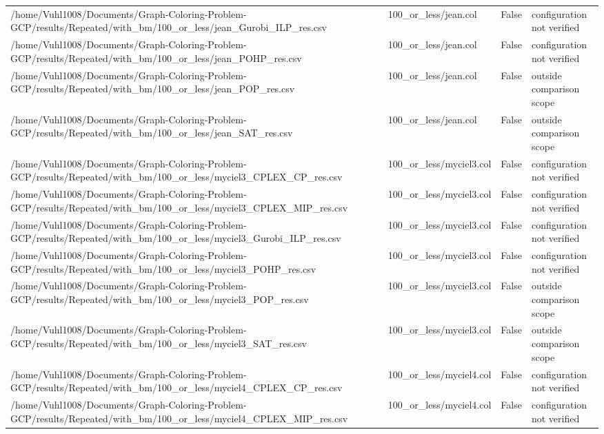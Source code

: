 \begin{table}[htbp]
\begin{tabular}{llll}
/home/Vuhl1008/Documents/Graph-Coloring-Problem-GCP/results/Repeated/with\_bm/100\_or\_less/jean\_Gurobi\_ILP\_res.csv & 100\_or\_less/jean.col & False & configuration not verified \\
/home/Vuhl1008/Documents/Graph-Coloring-Problem-GCP/results/Repeated/with\_bm/100\_or\_less/jean\_POHP\_res.csv & 100\_or\_less/jean.col & False & configuration not verified \\
/home/Vuhl1008/Documents/Graph-Coloring-Problem-GCP/results/Repeated/with\_bm/100\_or\_less/jean\_POP\_res.csv & 100\_or\_less/jean.col & False & outside comparison scope \\
/home/Vuhl1008/Documents/Graph-Coloring-Problem-GCP/results/Repeated/with\_bm/100\_or\_less/jean\_SAT\_res.csv & 100\_or\_less/jean.col & False & outside comparison scope \\
/home/Vuhl1008/Documents/Graph-Coloring-Problem-GCP/results/Repeated/with\_bm/100\_or\_less/myciel3\_CPLEX\_CP\_res.csv & 100\_or\_less/myciel3.col & False & configuration not verified \\
/home/Vuhl1008/Documents/Graph-Coloring-Problem-GCP/results/Repeated/with\_bm/100\_or\_less/myciel3\_CPLEX\_MIP\_res.csv & 100\_or\_less/myciel3.col & False & configuration not verified \\
/home/Vuhl1008/Documents/Graph-Coloring-Problem-GCP/results/Repeated/with\_bm/100\_or\_less/myciel3\_Gurobi\_ILP\_res.csv & 100\_or\_less/myciel3.col & False & configuration not verified \\
/home/Vuhl1008/Documents/Graph-Coloring-Problem-GCP/results/Repeated/with\_bm/100\_or\_less/myciel3\_POHP\_res.csv & 100\_or\_less/myciel3.col & False & configuration not verified \\
/home/Vuhl1008/Documents/Graph-Coloring-Problem-GCP/results/Repeated/with\_bm/100\_or\_less/myciel3\_POP\_res.csv & 100\_or\_less/myciel3.col & False & outside comparison scope \\
/home/Vuhl1008/Documents/Graph-Coloring-Problem-GCP/results/Repeated/with\_bm/100\_or\_less/myciel3\_SAT\_res.csv & 100\_or\_less/myciel3.col & False & outside comparison scope \\
/home/Vuhl1008/Documents/Graph-Coloring-Problem-GCP/results/Repeated/with\_bm/100\_or\_less/myciel4\_CPLEX\_CP\_res.csv & 100\_or\_less/myciel4.col & False & configuration not verified \\
/home/Vuhl1008/Documents/Graph-Coloring-Problem-GCP/results/Repeated/with\_bm/100\_or\_less/myciel4\_CPLEX\_MIP\_res.csv & 100\_or\_less/myciel4.col & False & configuration not verified \\

\end{tabular}
\end{table}
